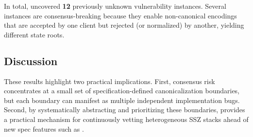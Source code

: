 In total, \tool uncovered \textbf{12} previously unknown vulnerability instances.
Several instances are consensus-breaking because they enable non-canonical encodings that are accepted by one client but rejected (or normalized) by another, yielding different state roots.

\subsection{Discussion}

These results highlight two practical implications.
First, consensus risk concentrates at a small set of specification-defined canonicalization boundaries, but each boundary can manifest as multiple independent implementation bugs.
Second, by systematically abstracting and prioritizing these boundaries, \tool provides a practical mechanism for continuously vetting heterogeneous SSZ stacks ahead of new spec features such as \cite{eip6800}.
